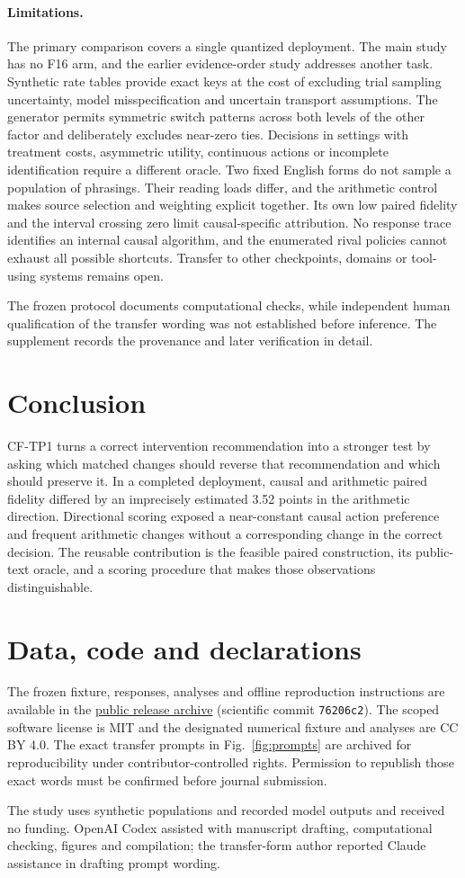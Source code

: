 \paragraph{Limitations.}
The primary comparison covers a single quantized deployment. The main study has no F16 arm, and the earlier evidence-order study addresses another task. Synthetic rate tables provide exact keys at the cost of excluding trial sampling uncertainty, model misspecification and uncertain transport assumptions. The generator permits symmetric switch patterns across both levels of the other factor and deliberately excludes near-zero ties. Decisions in settings with treatment costs, asymmetric utility, continuous actions or incomplete identification require a different oracle. Two fixed English forms do not sample a population of phrasings. Their reading loads differ, and the arithmetic control makes source selection and weighting explicit together. Its own low paired fidelity and the interval crossing zero limit causal-specific attribution. No response trace identifies an internal causal algorithm, and the enumerated rival policies cannot exhaust all possible shortcuts. Transfer to other checkpoints, domains or tool-using systems remains open.

The frozen protocol documents computational checks, while independent human qualification of the transfer wording was not established before inference. The supplement records the provenance and later verification in detail.

\section{Conclusion}
CF-TP1 turns a correct intervention recommendation into a stronger test by asking which matched changes should reverse that recommendation and which should preserve it. In a completed deployment, causal and arithmetic paired fidelity differed by an imprecisely estimated 3.52 points in the arithmetic direction. Directional scoring exposed a near-constant causal action preference and frequent arithmetic changes without a corresponding change in the correct decision. The reusable contribution is the feasible paired construction, its public-text oracle, and a scoring procedure that makes those observations distinguishable.

\section*{Data, code and declarations}
The frozen fixture, responses, analyses and offline reproduction instructions are available in the \href{https://github.com/mutasim-rehman/project-causalfade/releases/tag/cohort-029-v1.0.0}{public release archive} (scientific commit \texttt{76206c2}). The scoped software license is MIT and the designated numerical fixture and analyses are CC BY 4.0. The exact transfer prompts in Fig.~\ref{fig:prompts} are archived for reproducibility under contributor-controlled rights. Permission to republish those exact words must be confirmed before journal submission.

The study uses synthetic populations and recorded model outputs and received no funding. OpenAI Codex assisted with manuscript drafting, computational checking, figures and compilation; the transfer-form author reported Claude assistance in drafting prompt wording.
